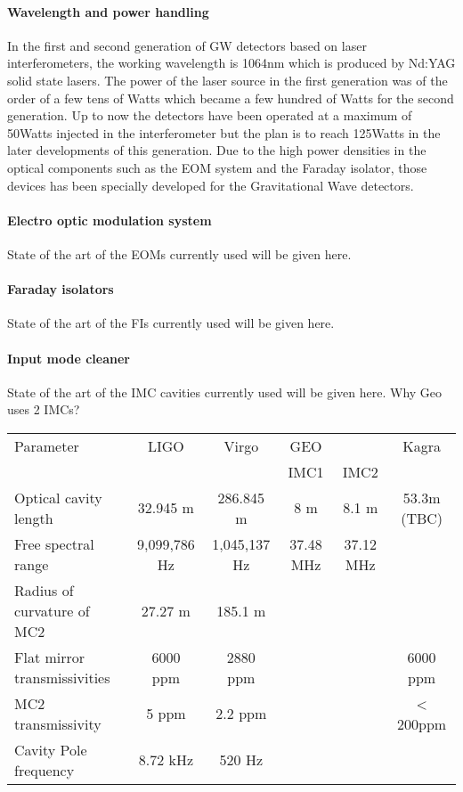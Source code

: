 \paragraph {Wavelength and power handling}
In the first and second generation of GW detectors based on laser interferometers, the working wavelength is 1064nm which is produced by Nd:YAG solid state lasers. The power of the laser source in the first generation was of the order of a few tens of Watts which became a few hundred of Watts for the second generation. Up to now the detectors have been operated at a maximum of 50Watts injected in the interferometer but the plan is to reach 125Watts in the later developments of this generation. Due to the high power densities in the optical components such as the EOM system and the Faraday isolator, those devices has been specially developed for the Gravitational Wave detectors. 

\paragraph {Electro optic modulation system}
State of the art of the EOMs currently used will be given here.

\paragraph {Faraday isolators}
State of the art of the FIs currently used will be given here.

\paragraph {Input mode cleaner}
State of the art of the IMC cavities currently used will be given here.
Why Geo uses 2 IMCs?

\begin{table}[htp]
\begin{tabular}{@{}l c c c c c@{}}
Parameter & LIGO & Virgo & GEO & &Kagra\\
       &  &   &  IMC1  & IMC2 &  \\
\hline
Optical cavity length & 32.945 m & 286.845 m & 8 m & 8.1 m & 53.3m (TBC)\\
Free spectral range & 9,099,786 Hz & 1,045,137 Hz & 37.48 MHz & 37.12 MHz &\\
Radius of curvature of MC2 & 27.27 m & 185.1 m& & &\\
Flat mirror transmissivities & 6000 ppm & 2880 ppm & & & 6000 ppm \\
MC2 transmissivity & 5 ppm & 2.2 ppm & & &< 200ppm\\
Cavity Pole frequency & 8.72 kHz & 520 Hz & & & \\
\hline
\end{tabular}
\label{IMC cavities main parameters}
\end{table}


